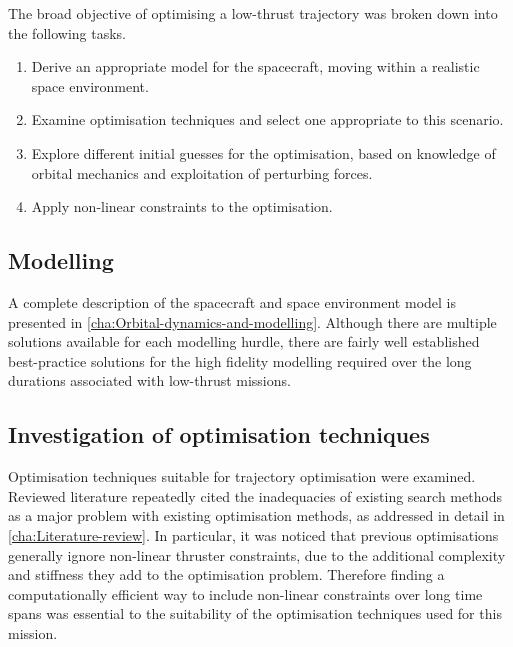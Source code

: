The broad objective of optimising a low-thrust trajectory was broken down into the following tasks.

\begin{enumerate}
  \item Derive an appropriate model for the spacecraft, moving within a realistic space environment.
  \item Examine optimisation techniques and select one appropriate to this scenario.
  \item Explore different initial guesses for the optimisation, based on knowledge of orbital mechanics and exploitation of perturbing forces.
  \item Apply non-linear constraints to the optimisation.
\end{enumerate}

\subsection{Modelling} \label{sub:Modelling-task}

A complete description of the spacecraft and space environment model is presented in \autoref{cha:Orbital-dynamics-and-modelling}. Although there are multiple solutions available for each modelling hurdle, there are fairly well established best-practice solutions for the high fidelity modelling required over the long durations associated with low-thrust missions.

\subsection{Investigation of optimisation techniques} \label{sub:Optimisation-techniques}

Optimisation techniques suitable for trajectory optimisation were examined. Reviewed literature repeatedly cited the inadequacies of existing search methods as a major problem with existing optimisation methods, as addressed in detail in \autoref{cha:Literature-review}. In particular, it was noticed that previous optimisations generally ignore non-linear thruster constraints, due to the additional complexity and stiffness they add to the optimisation problem. Therefore finding a computationally efficient way to include non-linear constraints over long time spans was essential to the suitability of the optimisation techniques used for this mission.
 

